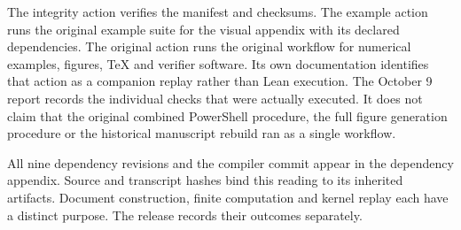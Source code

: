 The integrity action verifies the manifest and checksums. The example action runs the original example suite for the visual appendix with its declared dependencies. The original action runs the original workflow for numerical examples, figures, TeX and verifier software. Its own documentation identifies that action as a companion replay rather than Lean execution. The October 9 report records the individual checks that were actually executed. It does not claim that the original combined PowerShell procedure, the full figure generation procedure or the historical manuscript rebuild ran as a single workflow.

All nine dependency revisions and the compiler commit appear in the dependency appendix. Source and transcript hashes bind this reading to its inherited artifacts. Document construction, finite computation and kernel replay each have a distinct purpose. The release records their outcomes separately.
